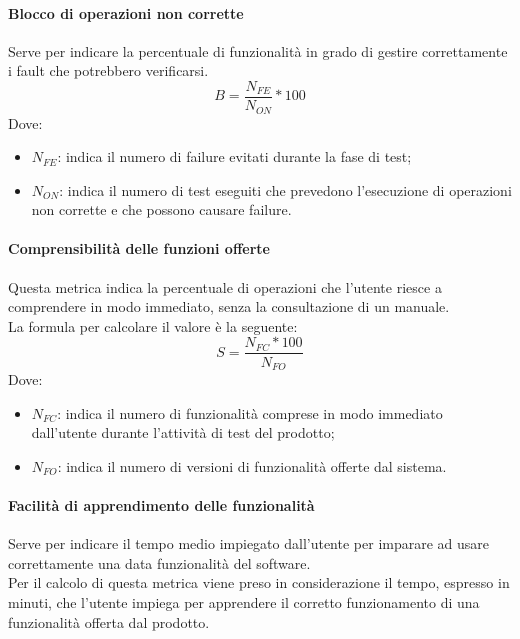 \documentclass[../NormeDiProgetto.tex]{subfiles}
\begin{document}
			\paragraph{Blocco di operazioni non corrette}
				Serve per indicare la percentuale di funzionalità in grado di gestire correttamente i fault che potrebbero verificarsi.
				\begin{equation*}
					B = \frac{N_{FE}}{N_{ON}} * 100
				\end{equation*}
				Dove:
				\begin{itemize}
					\item \textbf{$N_{FE}$}: indica il numero di failure evitati durante la fase di test;
					\item \textbf{$N_{ON}$}: indica il numero di test eseguiti che prevedono l'esecuzione di operazioni non corrette e che possono causare failure.
				\end{itemize}

			\paragraph{Comprensibilità delle funzioni offerte}
				Questa metrica indica la percentuale di operazioni che l'utente riesce a comprendere in modo immediato, senza la consultazione di un manuale.\\La formula per calcolare il valore è la seguente:
				\begin{equation*}
					S = \frac{N_{FC} * 100}{N_{FO}}
				\end{equation*}
				Dove:
				\begin{itemize}
					\item \textbf{$N_{FC}$}: indica il numero di funzionalità comprese in modo immediato dall'utente durante l'attività di test del prodotto;
					\item \textbf{$N_{FO}$}: indica il numero di versioni di funzionalità offerte dal sistema.
				\end{itemize}
				
			\paragraph{Facilità di apprendimento delle funzionalità}
				Serve per indicare il tempo medio impiegato dall'utente per imparare ad usare correttamente una data funzionalità del software.\\
			Per il calcolo di questa metrica viene preso in considerazione il tempo, espresso in minuti, che l'utente impiega per apprendere il corretto funzionamento di una funzionalità offerta dal prodotto.
				
\end{document}
